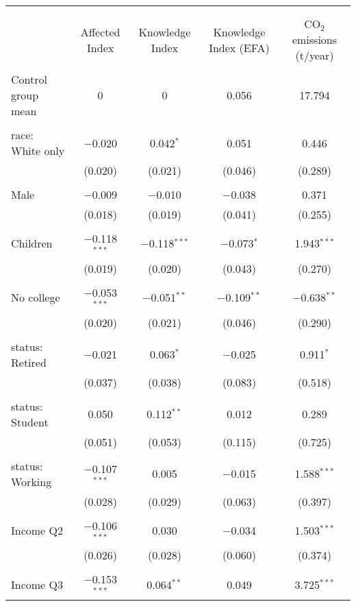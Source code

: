 
\begin{tabular}{@{\extracolsep{5pt}}lcccc} 
\\[-1.8ex]\hline 
\hline \\[-1.8ex] 
\\[-1.8ex] & Affected Index & Knowledge Index & Knowledge Index (EFA) & CO$_{2}$ emissions (t/year) \\ 
\hline \\[-1.8ex] 
 Control group mean & 0 & 0 & 0.056 & 17.794  \\ \hline \\[-1.8ex] race: White only & $-$0.020 & 0.042$^{*}$ & 0.051 & 0.446 \\ 
  & (0.020) & (0.021) & (0.046) & (0.289) \\ 
  & & & & \\ 
 Male & $-$0.009 & $-$0.010 & $-$0.038 & 0.371 \\ 
  & (0.018) & (0.019) & (0.041) & (0.255) \\ 
  & & & & \\ 
 Children & $-$0.118$^{***}$ & $-$0.118$^{***}$ & $-$0.073$^{*}$ & 1.943$^{***}$ \\ 
  & (0.019) & (0.020) & (0.043) & (0.270) \\ 
  & & & & \\ 
 No college & $-$0.053$^{***}$ & $-$0.051$^{**}$ & $-$0.109$^{**}$ & $-$0.638$^{**}$ \\ 
  & (0.020) & (0.021) & (0.046) & (0.290) \\ 
  & & & & \\ 
 status: Retired & $-$0.021 & 0.063$^{*}$ & $-$0.025 & 0.911$^{*}$ \\ 
  & (0.037) & (0.038) & (0.083) & (0.518) \\ 
  & & & & \\ 
 status: Student & 0.050 & 0.112$^{**}$ & 0.012 & 0.289 \\ 
  & (0.051) & (0.053) & (0.115) & (0.725) \\ 
  & & & & \\ 
 status: Working & $-$0.107$^{***}$ & 0.005 & $-$0.015 & 1.588$^{***}$ \\ 
  & (0.028) & (0.029) & (0.063) & (0.397) \\ 
  & & & & \\ 
 Income Q2 & $-$0.106$^{***}$ & 0.030 & $-$0.034 & 1.503$^{***}$ \\ 
  & (0.026) & (0.028) & (0.060) & (0.374) \\ 
  & & & & \\ 
 Income Q3 & $-$0.153$^{***}$ & 0.064$^{**}$ & 0.049 & 3.725$^{***}$ \\ 

\end{tabular}

